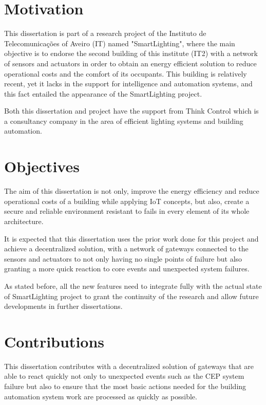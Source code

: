 \section{Motivation}

This dissertation is part of a research project of the Instituto de Telecomunicações of Aveiro (IT) named "SmartLighting", where the main objective is to endorse the second building of this institute (IT2) with a network of sensors and actuators in order to obtain an energy efficient solution to reduce operational costs and the comfort of its occupants. This building is relatively recent, yet it lacks in the support for intelligence and automation systems, and this fact entailed the appearance of the SmartLighting project. 

Both this dissertation and project have the support from Think Control which is a consultancy company in the area of efficient lighting systems and building automation.

\section{Objectives}

The aim of this dissertation is not only, improve the energy efficiency and reduce operational costs of a building while applying IoT concepts, but also, create a secure and reliable environment resistant to fails in every element of its whole architecture.

It is expected that this dissertation uses the prior work done for this project and achieve a decentralized solution, with a network of gateways connected to the sensors and actuators to not only having no single points of failure but also granting a more quick reaction to core events and unexpected system failures.

As stated before, all the new features need to integrate fully with the actual state of SmartLighting project to grant the continuity of the research and allow future developments in further dissertations.

\section{Contributions}

This dissertation contributes with a decentralized solution of gateways that are able to react quickly not only to unexpected events such as the CEP system failure but also to ensure that the most basic actions needed for the building automation system work are processed as quickly as possible.

